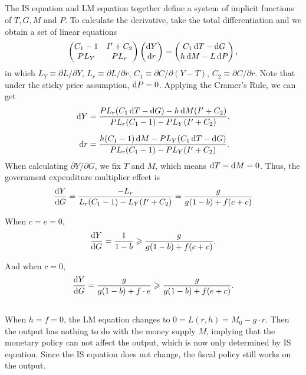 \documentclass{article}
\begin{document}
\subsection{}
The IS equation and LM equation together define a system of implicit functions of $T,G,M$ and $P$. To calculate the derivative, take the total differentiation and we obtain a set of linear equations
\[
    \begin{pmatrix}
        C_1 - 1 & I' + C_2 \\
        P L_Y & P L_r
    \end{pmatrix}
    \begin{pmatrix}
        \dif Y \\ \dif r
    \end{pmatrix} =
    \begin{pmatrix}
        C_1 \dif T - \dif G \\ h \dif M - L \dif P
    \end{pmatrix},
\]
in which $L_Y \equiv \partial L / \partial Y$, $L_r \equiv \partial L / \partial r$, $C_1 \equiv \partial C / \partial (Y-T)$, $C_2 \equiv \partial C / \partial r$. Note that under the sticky price assumption, $\dif P = 0$. Applying the Cramer's Rule, we can get
\begin{align}
    \dif Y &= \frac{P L_r (C_1 \dif T - \dif G) - h \dif M (I' + C_2)}{P L_r(C_1 - 1) - P L_Y (I' + C_2)}, \label{dy} \\[6pt]
    \dif r &= \frac{h(C_1 - 1)\dif M - P L_Y (C_1 \dif T - \dif G)}{P L_r(C_1 - 1) - P L_Y (I' + C_2)}. \notag
\end{align}
When calculating $\partial Y / \partial G$, we fix $T$ and $M$, which means $\dif T = \dif M = 0$. Thus, the government expenditure multiplier effect is
\begin{equation}
    \frac{\dif Y}{\dif G} = \frac{- L_r}{L_r(C_1 - 1) - L_Y (I' + C_2)} = \frac{g}{g (1 - b) + f(e + c)} \label{dydg}
\end{equation}    

When $c = e = 0$,
\[
    \frac{\dif Y}{\dif G} = \frac{1}{1 - b} 
    \geqslant \frac{g}{g (1 - b) + f(e + c)}.
\]

And when $c = 0$,
\[
    \frac{\dif Y}{\dif G} = \frac{g}{g (1 - b) + f \cdot e} \geqslant \frac{g}{g (1 - b) + f(e + c)}.
\]

\subsection{}
When $h = f = 0$, the LM equation changes to $0 = L(r, h) = M_0 - g \cdot r$. Then the output has nothing to do with the money supply $M$, implying that the monetary policy can not affect the output, which is now only determined by IS equation. Since the IS equation does not change, the fiscal policy still works on the output.
\end{document}
